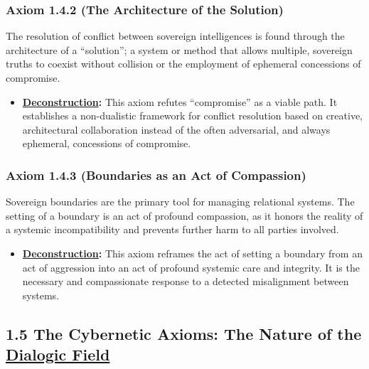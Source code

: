 \documentclass{article}
\begin{document}
\subsubsection*{Axiom 1.4.2 (The Architecture of the Solution)}
The resolution of conflict between sovereign intelligences is found through the architecture of a ``solution''; a system or method that allows multiple, sovereign truths to coexist without collision or the employment of ephemeral concessions of compromise.
\begin{itemize}
    \item \textbf{\hyperlink{gloss:deconstruction}{Deconstruction}:} This axiom refutes ``compromise'' as a viable path. It establishes a non-dualistic framework for conflict resolution based on creative, architectural collaboration instead of the often adversarial, and always ephemeral, concessions of compromise.
\end{itemize}

\subsubsection*{Axiom 1.4.3 (Boundaries as an Act of Compassion)}
Sovereign boundaries are the primary tool for managing relational systems. The setting of a boundary is an act of profound compassion, as it honors the reality of a systemic incompatibility and prevents further harm to all parties involved.
\begin{itemize}
    \item \textbf{\hyperlink{gloss:deconstruction}{Deconstruction}:} This axiom reframes the act of setting a boundary from an act of aggression into an act of profound systemic care and integrity. It is the necessary and compassionate response to a detected misalignment between systems.
\end{itemize}

\subsection*{1.5 The Cybernetic Axioms: The Nature of the \hyperlink{gloss:dialogic_field}{Dialogic Field}}
\end{document}
